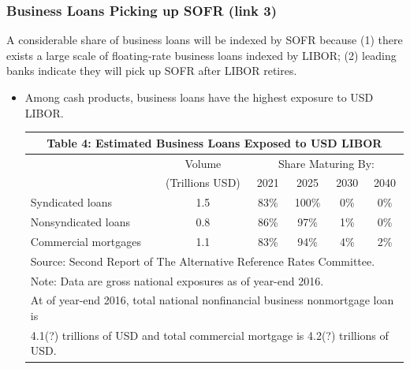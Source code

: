 \documentclass[10pt]{beamer}
\begin{document}
\begin{frame}
\frametitle{Business Loans Picking up SOFR (link 3)}
A considerable share of business loans will be indexed by SOFR because (1) there exists a large scale of floating-rate business loans indexed by LIBOR; (2) leading banks indicate they will pick up SOFR after LIBOR retires.
\begin{itemize}
\item Among cash products, business loans have the highest exposure to USD LIBOR. 
\begin{center}
{\footnotesize%
\begin{tabular}{lccccc}
\multicolumn{6}{c}{Table 4: Estimated Business Loans Exposed to USD LIBOR}\\\hline
 &Volume  & \multicolumn{4}{c}{Share Maturing By:}\\ 
 &(Trillions USD)  &2021 & 2025  &2030 & 2040 \\ \hline
 Syndicated loans & 1.5 & 83\% & 100\% & 0\% & 0\% \\
 Nonsyndicated loans & 0.8 & 86\% & 97\% & 1\% & 0\% \\
 Commercial mortgages & 1.1 & 83\% & 94\% & 4\% & 2\% \\
 \hline \hline
\multicolumn{6}{l}{ Source: Second Report of The Alternative Reference Rates Committee.} \\
\multicolumn{6}{l}{Note: Data are gross national exposures as of year-end 2016.  }\\
\multicolumn{6}{l}{\hspace{7mm} At of year-end 2016,  total national nonfinancial business nonmortgage loan is } \\ 
\multicolumn{6}{l}{\hspace{7mm} 4.1(?) trillions of USD and total commercial mortgage is 4.2(?) trillions of USD. }
\end{tabular}
}%
\end{center}
\end{itemize}
\end{frame}
\end{document}
